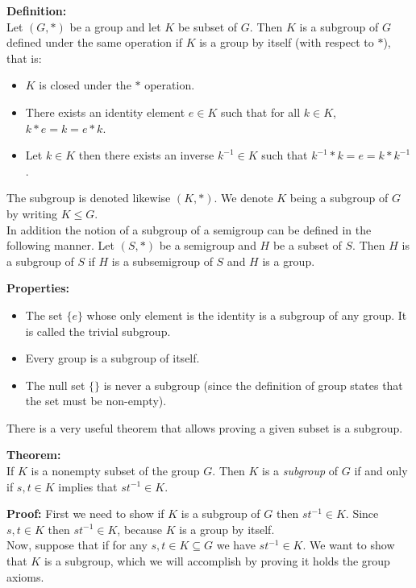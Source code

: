 \documentclass[12pt]{article}
\begin{document}

\textbf{Definition:}\\ 
Let $(G,*)$ be a group and let $K$ be subset of $G$.  Then $K$ is a subgroup of $G$ defined under the same operation if $K$ is  a group by itself (with respect to $*$), that is:
\begin{itemize}
  \item $K$ is closed under the $*$ operation.
  \item There exists an identity element $e\in K$ such that for all $k \in K$, $k*e = k = e*k$.
  \item Let $k \in K$ then there exists an inverse $k^{-1} \in K$
  such that $k^{-1}*k = e = k*k^{-1}$.
\end{itemize}
The subgroup is denoted likewise $(K,*)$. We denote $K$ being a subgroup of $G$ by writing $K\leq G$.\\

In addition the notion of a subgroup of a semigroup can be defined in the following manner.  Let $(S,*)$ be a semigroup and $H$ be a subset of $S$. Then $H$ is a subgroup of $S$ if $H$ is a subsemigroup of $S$ and $H$ is a group.

\textbf{Properties:}
\begin{itemize}
  \item The set $\{e\}$ whose only element is the identity is a subgroup of any group.  It is called the trivial subgroup.
\item Every group is a subgroup of itself.
  \item The null set $\{ \}$ is never a subgroup (since the definition of group states that the set must be non-empty).
\end{itemize}

There is a very useful theorem that allows proving a given subset is a subgroup.

\textbf{Theorem:}\\
If $K$ is a nonempty subset of the group $G$.  Then $K$ is a \emph{subgroup} of $G$ if and only if $s,t \in K$ implies that $st^{-1} \in K$.

\textbf{Proof:}
First we need to show if $K$ is a subgroup of $G$ then $st^{-1} \in K$.  Since $s,t \in K$ then $st^{-1} \in K$, because $K$ is a group by itself.\\
Now, suppose that if for any $s,t\in K\subseteq G$ we have $st^{-1}\in K$. We want to show that $K$ is a subgroup, which we will accomplish by proving it holds the group axioms.
\end{document}
